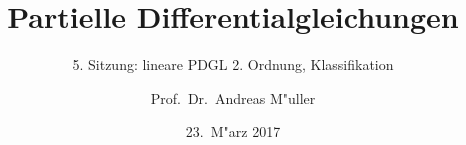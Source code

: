 \documentclass[handout]{beamer}
\title[]{Partielle Differentialgleichungen}
\subtitle{5. Sitzung: lineare PDGL 2. Ordnung, Klassifikation}
\date[23.~M"arz 2017]{23.~M"arz 2017}
\author{Prof.~Dr.~Andreas M"uller}
\begin{document}
\begin{frame}
\titlepage

\end{frame}


\end{document}
